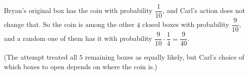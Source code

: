 Bryan's original box has the coin with probability $\dfrac1{10}$, and Carl's action does not change that. So the coin is among the other $4$ closed boxes with probability $\dfrac9{10}$, and a random one of them has it with probability $\dfrac9{10}\cdot\dfrac14=\boxed{\dfrac9{40}}$.

(The attempt treated all $5$ remaining boxes as equally likely, but Carl's choice of which boxes to open depends on where the coin is.)
